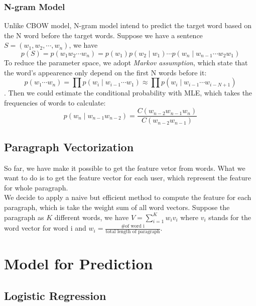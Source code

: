 \documentclass{article}
\begin{document}
\subsubsection{N-gram Model}
Unlike CBOW model, N-gram model intend to predict the target word based on the N word before the target words. Suppose we have a sentence $S=\left( w_1,w_2,\cdots,w_n\right) $, we have $$p(S)=p\left(w_{1} w_{2} \cdots w_{n}\right)=p\left(w_{1}\right) p\left(w_{2} \mid w_{1}\right) \cdots p\left(w_{n} \mid w_{n-1} \cdots w_{2} w_{1}\right)$$ To reduce the parameter space, we adopt \emph{Markov assumption}, which state that the word's appearence only depend on the first N words before it: $$p\left(w_{1} \cdots w_{n}\right)=\prod p\left(w_{i} \mid w_{i-1} \cdots w_{1}\right) \approx \prod p\left(w_{i} \mid w_{i-1} \cdots w_{i-N+1}\right)$$. Then we could estimate the conditional probability with MLE, which takes the frequencies of words to calculate:$$p\left(w_{n} \mid w_{n-1} w_{n-2}\right)=\frac{C\left(w_{n-2} w_{n-1} w_{n}\right)}{C\left(w_{n-2} w_{n-1}\right)}$$

\subsection{Paragraph Vectorization}
So far, we have make it possible to get the feature vetor from words. What we want to do is to get the feature vector for each user, which represent the feature for whole paragraph.\\
We decide to apply a naive but efficient method to compute the feature for each paragraph, which is take the weight sum of all word vectors. Suppose the paragraph as $K$ different words, we have $V = \sum_{i=1}^{K}w_iv_i$ where $v_i$ stands for the word vector for word i and $w_i = \frac{\text{\# of word i}}{\text{total length of paragraph}}$.

\section{Model for Prediction}
\subsection{Logistic Regression}

\end{document}
